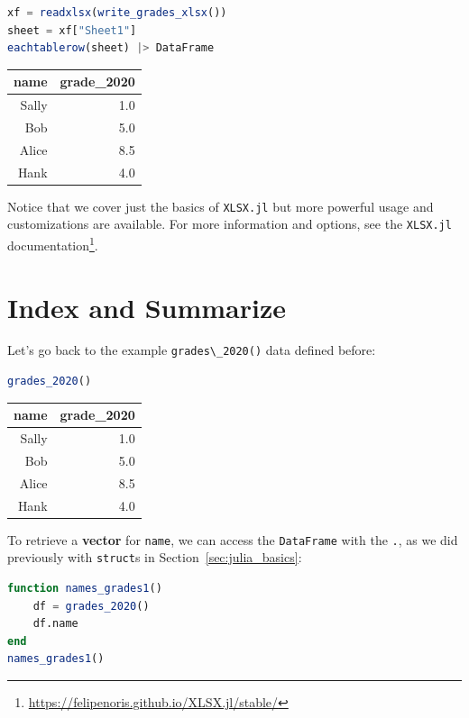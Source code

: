 \documentclass[
  notoc %
]{tufte-book}
\DeclareRobustCommand{\href}[2]{#2\footnote{\url{#1}}}
\newcommand{\passthrough}[1]{#1}
\begin{document}
\begin{lstlisting}[language=Julia]
xf = readxlsx(write_grades_xlsx())
sheet = xf["Sheet1"]
eachtablerow(sheet) |> DataFrame
\end{lstlisting}

\begin{longtable}[]{@{}rr@{}}
\toprule
name & grade\_2020 \\
\midrule
\endhead
Sally & 1.0 \\
Bob & 5.0 \\
Alice & 8.5 \\
Hank & 4.0 \\
\bottomrule
\end{longtable}

Notice that we cover just the basics of
\passthrough{\lstinline!XLSX.jl!} but more powerful usage and
customizations are available. For more information and options, see the
\href{https://felipenoris.github.io/XLSX.jl/stable/}{\passthrough{\lstinline!XLSX.jl!}
documentation}.

\hypertarget{index-and-summarize}{%
\section{Index and Summarize}\label{index-and-summarize}}

Let's go back to the example \passthrough{\lstinline!grades\_2020()!}
data defined before:

\begin{lstlisting}[language=Julia]
grades_2020()
\end{lstlisting}

\begin{longtable}[]{@{}rr@{}}
\toprule
name & grade\_2020 \\
\midrule
\endhead
Sally & 1.0 \\
Bob & 5.0 \\
Alice & 8.5 \\
Hank & 4.0 \\
\bottomrule
\end{longtable}

To retrieve a \textbf{vector} for \passthrough{\lstinline!name!}, we can
access the \passthrough{\lstinline!DataFrame!} with the
\passthrough{\lstinline!.!}, as we did previously with
\passthrough{\lstinline!struct!}s in Section~\ref{sec:julia_basics}:

\begin{lstlisting}[language=Julia]
function names_grades1()
    df = grades_2020()
    df.name
end
names_grades1()
\end{lstlisting}
\end{document}
